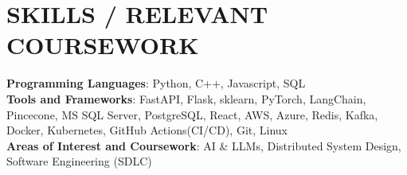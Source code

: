 \documentclass[letterpaper,11pt]{article}
\newcommand{\SectionListBegin}{\begin{itemize}[leftmargin=0.15in, label={}]}
\newcommand{\SectionListEnd}{\end{itemize}}
\newcommand{\swallow}[1]{}
\begin{document}
\section{SKILLS / RELEVANT COURSEWORK}
  \SectionListBegin
    \small{\item{
    \vspace{1mm}
     \textbf{Programming Languages}{: Python, C++, Javascript, SQL} \\
     \vspace{1mm}
     \textbf{Tools and Frameworks}{: FastAPI, Flask, sklearn, PyTorch, LangChain, Pincecone, MS SQL Server, PostgreSQL, React, AWS, Azure, Redis, Kafka, Docker, Kubernetes, GitHub Actions(CI/CD), Git, Linux}\\
     \vspace{1mm}
     \textbf{Areas of Interest and Coursework}{: AI \& LLMs, Distributed System Design, Software Engineering (SDLC) \swallow{Distributed System Design, Object Oriented Design (OOD), Computer Architecture} } \\
     \vspace{1mm}
    }}
  \SectionListEnd

\end{document}
